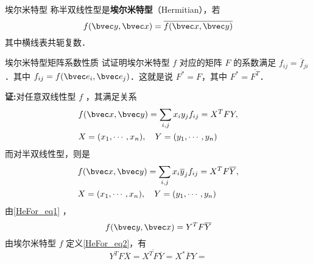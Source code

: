 
\begin{definition}{埃尔米特型}
称半双线性型是\textbf{埃尔米特型}（Hermitian），若
\begin{equation}\label{HeFor_eq2}
f(\bvec y,\bvec x)=\overline{f(\bvec x,\bvec y)}
\end{equation}
其中横线表共轭复数．
\end{definition}
\begin{example}{埃尔米特型矩阵系数性质}
试证明埃尔米特型 $f$ 对应的矩阵 $F$ 的系数满足 $f_{ij}=\overline f_{ji}$．其中 $f_{ij}=f(\bvec e_i,\bvec e_j)$．这就是说 $F^*=F$，其中 $F^*=\overline {F^T}$．

\textbf{证:}对任意双线性型 $f$ ，其满足关系
\begin{equation}
\begin{aligned}
&f(\bvec x,\bvec y)=\sum_{i,j}x_i y_j f_{ij}=X^TFY,\\
&X=(x_1,\cdots,x_n),\quad Y=(y_1,\cdots,y_n)
\end{aligned}
\end{equation}
而对半双线性型，则是
\begin{equation}\label{HeFor_eq1}
\begin{aligned}
&f(\bvec x,\bvec y)=\sum_{i,j}x_i \overline y_j f_{ij}=X^TF\overline Y,\\
&X=(x_1,\cdots,x_n),\quad Y=(y_1,\cdots,y_n)
\end{aligned}
\end{equation}
由\autoref{HeFor_eq1} ，
\begin{equation}
f(\bvec y,\bvec x)=Y^TF\overline Y
\end{equation}
由埃尔米特型 $f$ 定义\autoref{HeFor_eq2}，有
\begin{equation}
Y^TF\overline X=\overline{X^TF\overline Y}=X^*\overline FY=
\end{equation}
 
\end{example}
